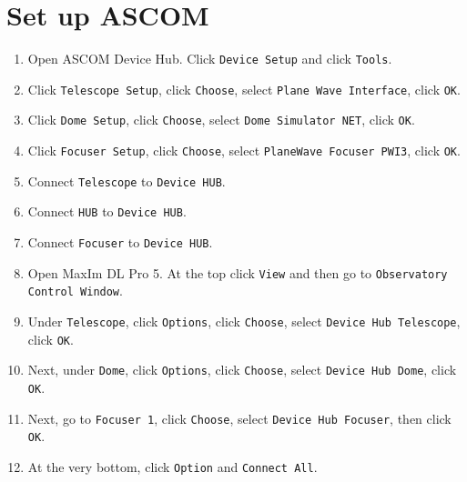 \documentclass{article}
\begin{document}
	\newpage
	\appendix
		
	\section{Set up ASCOM}
	\label{sec:set-up-ascom}
	
	\begin{enumerate}
		
		\item Open ASCOM Device Hub. Click \texttt{Device Setup} and click \texttt{Tools}.
		
		\item Click \texttt{Telescope Setup}, click \texttt{Choose}, select \texttt{Plane Wave Interface}, click \texttt{OK}.
		
		\item Click \texttt{Dome Setup}, click \texttt{Choose}, select \texttt{Dome Simulator NET}, click \texttt{OK}. 
		
		\item Click \texttt{Focuser Setup}, click \texttt{Choose}, select \texttt{PlaneWave Focuser PWI3}, click \texttt{OK}. 
		
		\item Connect \texttt{Telescope} to \texttt{Device HUB}. 
		
		\item Connect \texttt{HUB} to \texttt{Device HUB}. 
		
		\item Connect \texttt{Focuser} to \texttt{Device HUB}. 
		
		\item Open MaxIm DL Pro 5. At the top click \texttt{View} and then go to \texttt{Observatory Control Window}. 
		
		\item Under \texttt{Telescope}, click \texttt{Options}, click \texttt{Choose}, select \texttt{Device Hub Telescope}, click \texttt{OK}. 
		
		\item Next, under \texttt{Dome}, click \texttt{Options}, click \texttt{Choose}, select \texttt{Device Hub Dome}, click \texttt{OK}. 
		
		\item Next, go to \texttt{Focuser 1}, click \texttt{Choose}, select \texttt{Device Hub Focuser}, then click \texttt{OK}. 
		
		\item At the very bottom, click \texttt{Option} and \texttt{Connect All}. 
		

\end{enumerate}
\end{document}
